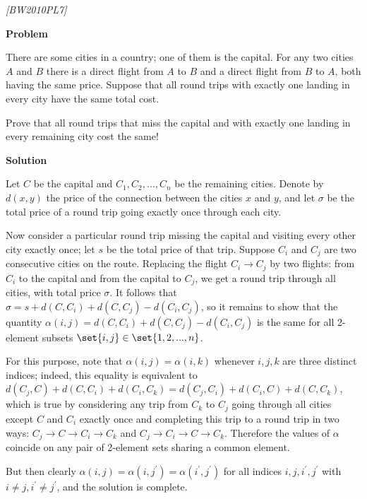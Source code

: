 \filbreak

\begin{problem}
\textit{[BW2010PL7]}



\textbf{Problem}


There are some cities in a country; one of them is the capital. For any two cities $A$ and $B$ there is a direct flight from $A$ to $B$ and a direct flight from $B$ to $A$, both having the
same price. Suppose that all round trips with exactly one landing in every city have the same total cost. 

Prove that all round trips that miss the capital and with exactly one landing in every remaining city cost the same!



\textbf{Solution}


Let $C$ be the capital and $C_1, C_2, \dots, C_n$ be the remaining cities. Denote by $d(x, y)$
the price of the connection between the cities $x$ and $y$, and let $\sigma$ be the total price of a round
trip going exactly once through each city.


Now consider a particular round trip missing the capital and visiting every other city exactly once; let $s$ be the total price of that trip. Suppose $C_i$ and $C_j$ are two consecutive cities on the route.
Replacing the flight $C_i \rightarrow C_j$ by two flights: from $C_i$ to the capital and from the capital to $C_j$, we
get a round trip through all cities, with total price $\sigma$. It follows that $\sigma = s+d(C, C_i)+d(C, C_j )−d(C_i, C_j )$, so it remains to show that the quantity $\alpha(i,j) = d(C, C_i) + d(C, C_j )−d(C_i, C_j )$ is the same for all 2-element subsets $\set{i, j} \in \set{1, 2, . . . , n}$.



For this purpose, note that $\alpha(i, j) = \alpha(i, k)$ whenever $i, j, k$ are three distinct indices; indeed,
this equality is equivalent to $d(C_j , C) + d(C, C_i) + d(C_i, C_k) = d(C_j , C_i) + d(C_i, C) + d(C, C_k)$, which is true by considering any trip from $C_k$ to $C_j$ going through all cities except $C$ and $C_i$ exactly once and completing this trip to a round trip in two ways: $C_j \rightarrow C \rightarrow C_i \rightarrow C_k$ and $C_j \rightarrow C_i \rightarrow C \rightarrow C_k$. Therefore the values of $\alpha$ coincide on any pair of 2-element sets sharing a common element. 

But then clearly $\alpha(i, j) = \alpha(i, j^\prime)= \alpha(i^\prime, j^\prime)$ for all indices $i, j, i^\prime, j^\prime$ with $i\ne j, i^\prime \ne j^\prime $, and the solution is complete.

\end{problem}
